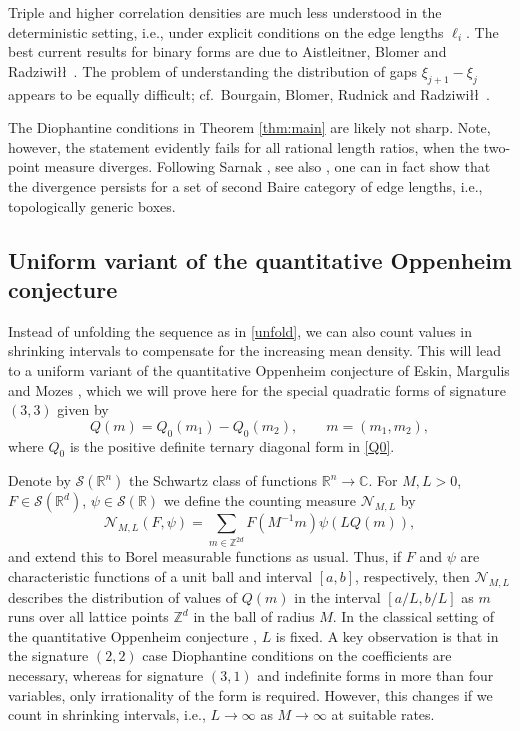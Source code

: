 \documentclass[12pt]{amsart}
\theoremstyle{definition}
\theoremstyle{remark}
\numberwithin{equation}{section}
\newcommand{\R}{\mathbb{R}}
\newcommand{\Z}{\mathbb{Z}}
\newcommand{\C}{\mathbb{C}}
\newcommand{\cN}{\mathcal{N}}
\newcommand{\cS}{\mathcal{S}}
\begin{document}
Triple and higher correlation densities are much less understood in the deterministic setting, i.e., under explicit conditions on the edge lengths $\ell_i$. The best current results for binary forms are due to Aistleitner, Blomer and Radziwi\l\l\ \cite{ABR2024}. The problem of understanding the distribution of gaps $\xi_{j+1}-\xi_j$ appears to be equally difficult; cf.~Bourgain, Blomer, Rudnick and Radziwi\l\l\ \cite{BBRR2017}.

The Diophantine conditions in Theorem \ref{thm:main} are likely not sharp. Note, however, the statement evidently fails for all rational length ratios, when the two-point measure diverges. Following Sarnak \cite{Sarnak1997}, see also \cite{VanderKam1999a,VanderKam1999b,VanderKam2000,Marklof2002,Marklof2002b,Marklof2003}, one can in fact show that the divergence persists for a set of second Baire category of edge lengths, i.e., topologically generic boxes.


\subsection{Uniform variant of the quantitative Oppenheim conjecture}

Instead of unfolding the sequence as in \eqref{unfold}, we can also count values in shrinking intervals to compensate for the increasing mean density. This will lead to a uniform variant of the quantitative Oppenheim conjecture of Eskin, Margulis and Mozes \cite{EskinMargulisMozes1998,EskinMargulisMozes2005}, which we will prove here for the special quadratic forms of signature $(3,3)$ given by
\begin{equation}
Q(m) = Q_0(m_1)-Q_0(m_2), \qquad m=(m_1,m_2),
\end{equation}
where $Q_0$ is the positive definite ternary diagonal form in \eqref{Q0}.

Denote by $\cS(\R^n)$ the Schwartz class of functions $\R^n\to\C$. For $M,L>0$, $F\in\cS(\R^d)$, $\psi\in\cS(\R)$ we define the counting measure $\cN_{M,L}$ by
\begin{equation}
 \label{eq:NLMdef}
  \cN_{M,L}(F,\psi) 
  =  \sum_{m\in \Z^{2d}} F(M^{-1} m) \psi ( L Q(m)) ,
\end{equation}
and extend this to Borel measurable functions as usual. Thus, if $F$ and $\psi$ are characteristic functions of a unit ball and interval $[a,b]$, respectively, then $\cN_{M,L}$ describes the distribution of values of $Q(m)$ in the interval $[a/L,b/L]$ as $m$ runs over all lattice points $\Z^d$ in the ball of radius $M$. In the classical setting of the quantitative Oppenheim conjecture \cite{EskinMargulisMozes1998,EskinMargulisMozes2005}, $L$ is fixed. A key observation is that in the signature $(2,2)$ case Diophantine conditions on the coefficients are necessary, whereas for signature $(3,1)$ and indefinite forms in more than four variables, only irrationality of the form is required.
However, this changes
if we count in shrinking intervals, i.e., $L\to\infty$ as $M\to\infty$ at suitable rates.
\end{document}
